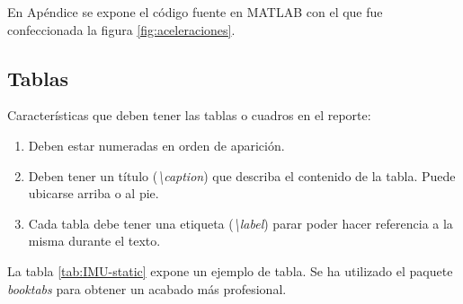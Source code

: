 \documentclass{article}
\begin{document}
En Apéndice se expone el código fuente en MATLAB con el que fue confeccionada la figura \ref{fig:aceleraciones}.

\subsection{Tablas}
\label{sec:tablas}

Características que deben tener las tablas o cuadros en el reporte:

\begin{enumerate}

    \item Deben estar numeradas en orden de aparición.

    \item Deben tener un título (\emph{\textbackslash caption}) que describa el contenido de la tabla. Puede ubicarse arriba o al pie.

    \item Cada tabla debe tener una etiqueta (\emph{\textbackslash label}) parar poder hacer referencia a la misma durante el texto.

\end{enumerate}

La tabla \ref{tab:IMU-static} expone un ejemplo de tabla. Se ha utilizado el paquete \emph{booktabs} para obtener un acabado más profesional.
\end{document}
